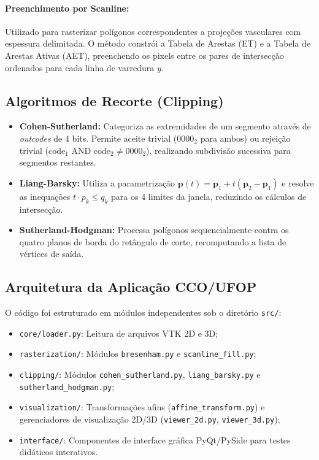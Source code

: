 \documentclass[11pt, a4paper]{article}
\begin{document}
\paragraph{Preenchimento por Scanline:}
Utilizado para rasterizar polígonos correspondentes a projeções vasculares com espessura delimitada. O método constrói a Tabela de Arestas (ET) e a Tabela de Arestas Ativas (AET), preenchendo os pixels entre os pares de intersecção ordenados para cada linha de varredura $y$.

\subsection{Algoritmos de Recorte (Clipping)}
\begin{itemize}[leftmargin=*]
  \item \textbf{Cohen-Sutherland:} Categoriza as extremidades de um segmento através de \textit{outcodes} de 4 bits. Permite aceite trivial ($0000_2$ para ambos) ou rejeição trivial ($\text{code}_1 \text{ AND } \text{code}_2 \neq 0000_2$), realizando subdivisão sucessiva para segmentos restantes.
  \item \textbf{Liang-Barsky:} Utiliza a parametrização $\mathbf{p}(t) = \mathbf{p}_1 + t(\mathbf{p}_2 - \mathbf{p}_1)$ e resolve as inequações $t \cdot p_k \le q_k$ para os 4 limites da janela, reduzindo os cálculos de intersecção.
  \item \textbf{Sutherland-Hodgman:} Processa polígonos sequencialmente contra os quatro planos de borda do retângulo de corte, recomputando a lista de vértices de saída.
\end{itemize}

\subsection{Arquitetura da Aplicação CCO/UFOP}
O código foi estruturado em módulos independentes sob o diretório \texttt{src/}:
\begin{itemize}[leftmargin=*]
  \item \texttt{core/loader.py}: Leitura de arquivos VTK 2D e 3D;
  \item \texttt{rasterization/}: Módulos \texttt{bresenham.py} e \texttt{scanline\_fill.py};
  \item \texttt{clipping/}: Módulos \texttt{cohen\_sutherland.py}, \texttt{liang\_barsky.py} e \texttt{sutherland\_hodgman.py};
  \item \texttt{visualization/}: Transformações afins (\texttt{affine\_transform.py}) e gerenciadores de visualização 2D/3D (\texttt{viewer\_2d.py}, \texttt{viewer\_3d.py});
  \item \texttt{interface/}: Componentes de interface gráfica PyQt/PySide para testes didáticos interativos.
\end{itemize}
\end{document}
